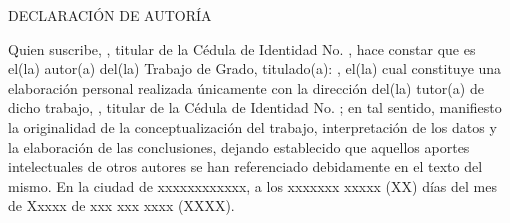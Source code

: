\vspace*{1.5cm}
\begin{center}
\large{DECLARACIÓN DE AUTORÍA}
\end{center}
Quien suscribe, \Autor, titular de la Cédula de Identidad No. \Cedula, hace constar que es el(la) autor(a) del(la) Trabajo de Grado, titulado(a): \Titulo, el(la) cual constituye una elaboración personal realizada únicamente con la dirección del(la) tutor(a) de dicho trabajo, \Tutor, titular de la Cédula de Identidad No. \Cedula; en tal sentido, manifiesto la originalidad de la conceptualización del trabajo, interpretación de los datos y la elaboración de las conclusiones, dejando establecido que aquellos aportes intelectuales de otros autores se han referenciado debidamente en el texto del mismo.
En la ciudad de xxxxxxxxxxxx, a los xxxxxxx xxxxx (XX) días del mes de Xxxxx de xxx xxx xxxx (XXXX).